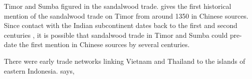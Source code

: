


Timor and Sumba figured in the sandalwood trade.
\citet[1]{Hagerdal2012} gives the first historical
mention of the sandalwood trade on Timor
from around 1350  in Chinese sources.
Since contact with the Indian subcontinent dates back to the
first and second centuries ,
it is possible that sandalwood trade in Timor
and Sumba could pre-date the first mention in Chinese sources
by several centuries.

There were early trade networks linking Vietnam
and Thailand to the islands of eastern Indonesia.
\citet[17]{Klamer2019} says, 

